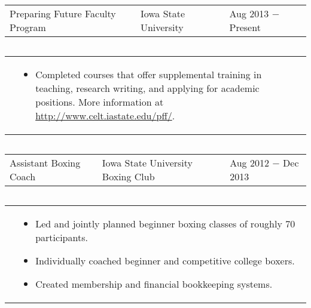 \documentclass{article}
\newcommand{\q}{$\quad$ \newline}
\newcommand{\vl}{4.25}
\newcommand{\wl}{8.4}
\newcommand{\ww}{13}
\begin{document}
\noindent \begin{tabular}{@{}p{\vl cm}p{\wl cm}l@{}}
Preparing Future Faculty Program & Iowa State University & Aug 2013 $-$ Present
\end{tabular} \q 
 
\noindent \begin{tabular}{@{}p{\vl cm}p{\ww cm}@{}}
& \begin{itemize}
\item Completed courses that offer supplemental training in teaching, research writing, and applying for academic positions.  More information at \url{http://www.celt.iastate.edu/pff/}.
\end{itemize}
\end{tabular} \q 
 
 
 
 
\noindent \begin{tabular}{@{}p{\vl cm}p{\wl cm}l@{}}
Assistant Boxing Coach & Iowa State University Boxing Club & Aug 2012 $-$ Dec 2013
\end{tabular} \q 
 
\noindent \begin{tabular}{@{}p{\vl cm}p{\ww cm}@{}}
& \begin{itemize}
\item Led and jointly planned beginner boxing classes of roughly 70 participants. 
\item Individually coached beginner and competitive college boxers. 
\item Created membership and financial bookkeeping systems.
\end{itemize}
\end{tabular} \q 



 
\end{document}

